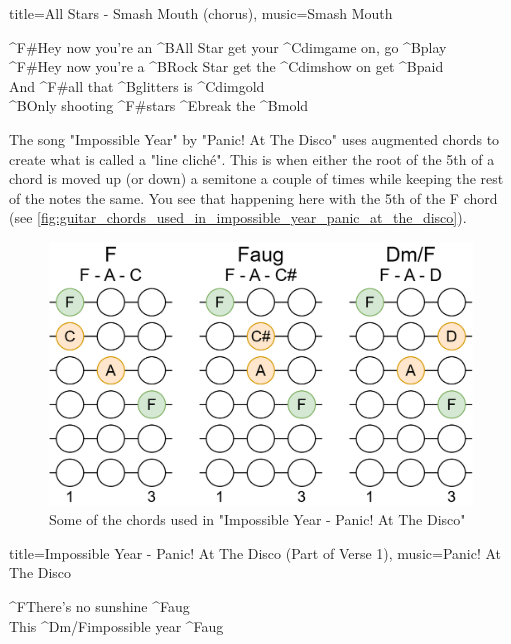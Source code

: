 \begin{song}[verse/numbered, align-chords=l]{title={All Stars - Smash Mouth (chorus)}, music={Smash Mouth}}
	\begin{chorus}
		^{F#}Hey now you're an ^{B}All Star get your ^{Cdim}game on, go ^{B}play \\
		^{F#}Hey now you're a ^{B}Rock Star get the ^{Cdim}show on get ^{B}paid \\
		And ^{F#}all that ^{B}glitters is ^{Cdim}gold \\
	 	^{B}Only shooting ^{F#}stars ^{E}break the ^{B}mold \\
	\end{chorus}
\end{song}



The song "Impossible Year" by "Panic! At The Disco" uses augmented chords to create what is called a "line cliché". This is when either the root of the 5th of a chord is moved up (or down) a semitone a couple of times while keeping the rest of the notes the same. You see that happening here with the 5th of the F chord (see \autoref{fig:guitar_chords_used_in_impossible_year_panic_at_the_disco}).

\begin{figure}[h]
	\centering
	\includegraphics[height=0.16\textheight]{../../Images/ChordsUsedInImpossibleYearPanicAtTheDisco.png}
	\caption{Some of the chords used in "Impossible Year - Panic! At The Disco"}
	\label{fig:guitar_chords_used_in_impossible_year_panic_at_the_disco}
\end{figure}

\begin{song}[verse/numbered, align-chords=l]{title={Impossible Year - Panic! At The Disco (Part of Verse 1)}, music={Panic! At The Disco}}
	\begin{chorus}
		^{F}There's no sunshine ^{Faug} \\
		This ^{Dm/F}impossible year ^{Faug} \\
	\end{chorus}
\end{song}

